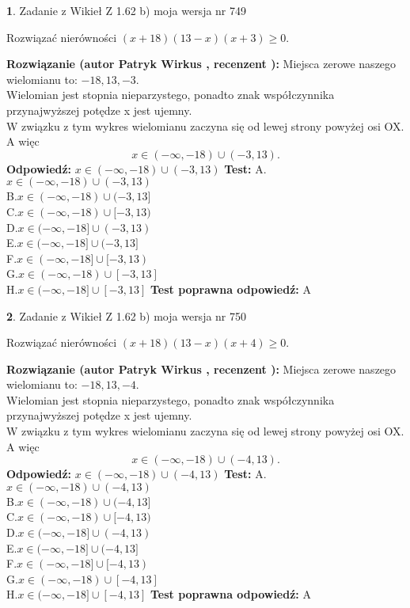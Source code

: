 \documentclass[12pt, a4paper]{article}
\theoremstyle{definition} %
\newtheorem{zad}{}
\newcommand{\zadStart}[1]{\begin{zad}#1\newline}
\newcommand{\zadStop}{\end{zad}}
\newcommand{\rozwStart}[2]{\noindent \textbf{Rozwiązanie (autor #1 , recenzent #2): }\newline}
\newcommand{\rozwStop}{\newline}
\newcommand{\odpStart}{\noindent \textbf{Odpowiedź:}\newline}
\newcommand{\odpStop}{\newline}
\newcommand{\testStart}{\noindent \textbf{Test:}\newline}
\newcommand{\testStop}{\newline}
\newcommand{\kluczStart}{\noindent \textbf{Test poprawna odpowiedź:}\newline}
\newcommand{\kluczStop}{\newline}
\begin{document}
\zadStart{Zadanie z Wikieł Z 1.62 b) moja wersja nr 749}

Rozwiązać nierówności $(x+18)(13-x)(x+3)\ge0$.
\zadStop
\rozwStart{Patryk Wirkus}{}
Miejsca zerowe naszego wielomianu to: $-18, 13, -3$.\\
Wielomian jest stopnia nieparzystego, ponadto znak współczynnika przy\linebreak najwyższej potędze x jest ujemny.\\ W związku z tym wykres wielomianu zaczyna się od lewej strony powyżej osi OX. A więc $$x \in (-\infty,-18) \cup (-3,13).$$
\rozwStop
\odpStart
$x \in (-\infty,-18) \cup (-3,13)$
\odpStop
\testStart
A.$x \in (-\infty,-18) \cup (-3,13)$\\
B.$x \in (-\infty,-18) \cup (-3,13]$\\
C.$x \in (-\infty,-18) \cup [-3,13)$\\
D.$x \in (-\infty,-18] \cup (-3,13)$\\
E.$x \in (-\infty,-18] \cup (-3,13]$\\
F.$x \in (-\infty,-18] \cup [-3,13)$\\
G.$x \in (-\infty,-18) \cup [-3,13]$\\
H.$x \in (-\infty,-18] \cup [-3,13]$
\testStop
\kluczStart
A
\kluczStop



\zadStart{Zadanie z Wikieł Z 1.62 b) moja wersja nr 750}

Rozwiązać nierówności $(x+18)(13-x)(x+4)\ge0$.
\zadStop
\rozwStart{Patryk Wirkus}{}
Miejsca zerowe naszego wielomianu to: $-18, 13, -4$.\\
Wielomian jest stopnia nieparzystego, ponadto znak współczynnika przy\linebreak najwyższej potędze x jest ujemny.\\ W związku z tym wykres wielomianu zaczyna się od lewej strony powyżej osi OX. A więc $$x \in (-\infty,-18) \cup (-4,13).$$
\rozwStop
\odpStart
$x \in (-\infty,-18) \cup (-4,13)$
\odpStop
\testStart
A.$x \in (-\infty,-18) \cup (-4,13)$\\
B.$x \in (-\infty,-18) \cup (-4,13]$\\
C.$x \in (-\infty,-18) \cup [-4,13)$\\
D.$x \in (-\infty,-18] \cup (-4,13)$\\
E.$x \in (-\infty,-18] \cup (-4,13]$\\
F.$x \in (-\infty,-18] \cup [-4,13)$\\
G.$x \in (-\infty,-18) \cup [-4,13]$\\
H.$x \in (-\infty,-18] \cup [-4,13]$
\testStop
\kluczStart
A
\kluczStop
\end{document}
